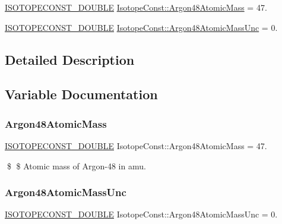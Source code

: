 \begin{DoxyCompactItemize}
\item 
\mbox{\hyperlink{group___isotope_const-_macros_ga8f45a7272ce02c0b4c65c44636ed719a}{I\+S\+O\+T\+O\+P\+E\+C\+O\+N\+S\+T\+\_\+\+D\+O\+U\+B\+LE}} \mbox{\hyperlink{group___isotope_const-_argon-_ar48_gaee56137351799e6e5f7b63d25f7b7c42}{Isotope\+Const\+::\+Argon48\+Atomic\+Mass}} = 47.
\item 
\mbox{\hyperlink{group___isotope_const-_macros_ga8f45a7272ce02c0b4c65c44636ed719a}{I\+S\+O\+T\+O\+P\+E\+C\+O\+N\+S\+T\+\_\+\+D\+O\+U\+B\+LE}} \mbox{\hyperlink{group___isotope_const-_argon-_ar48_gaef8bef85479d6e1636e2f91007302e01}{Isotope\+Const\+::\+Argon48\+Atomic\+Mass\+Unc}} = 0.
\end{DoxyCompactItemize}


\subsection{Detailed Description}


\subsection{Variable Documentation}
\mbox{\label{group___isotope_const-_argon-_ar48_gaee56137351799e6e5f7b63d25f7b7c42}} 
\subsubsection{\texorpdfstring{Argon48\+Atomic\+Mass}{Argon48AtomicMass}}
{\footnotesize\ttfamily \mbox{\hyperlink{group___isotope_const-_macros_ga8f45a7272ce02c0b4c65c44636ed719a}{I\+S\+O\+T\+O\+P\+E\+C\+O\+N\+S\+T\+\_\+\+D\+O\+U\+B\+LE}} Isotope\+Const\+::\+Argon48\+Atomic\+Mass = 47.}

\$ \$ Atomic mass of Argon-\/48 in amu. \mbox{\label{group___isotope_const-_argon-_ar48_gaef8bef85479d6e1636e2f91007302e01}} 
\subsubsection{\texorpdfstring{Argon48\+Atomic\+Mass\+Unc}{Argon48AtomicMassUnc}}
{\footnotesize\ttfamily \mbox{\hyperlink{group___isotope_const-_macros_ga8f45a7272ce02c0b4c65c44636ed719a}{I\+S\+O\+T\+O\+P\+E\+C\+O\+N\+S\+T\+\_\+\+D\+O\+U\+B\+LE}} Isotope\+Const\+::\+Argon48\+Atomic\+Mass\+Unc = 0.}

